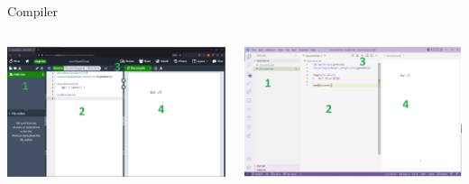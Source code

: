 \copyrightVincent

\begin{frame}[fragile]{Compiler}
    \centering

    \begin{columns}
        \begin{column}{0.5\textwidth}
            \includegraphics[width=\linewidth,height=0.8\textheight,keepaspectratio]
            {assets/overleaf_compile_parts.png}
        \end{column}
        \begin{column}{0.5\textwidth}
            \includegraphics[width=\linewidth,height=0.8\textheight,keepaspectratio]
            {assets/vscode_compile_parts.png}
        \end{column}
    \end{columns}
\end{frame}


